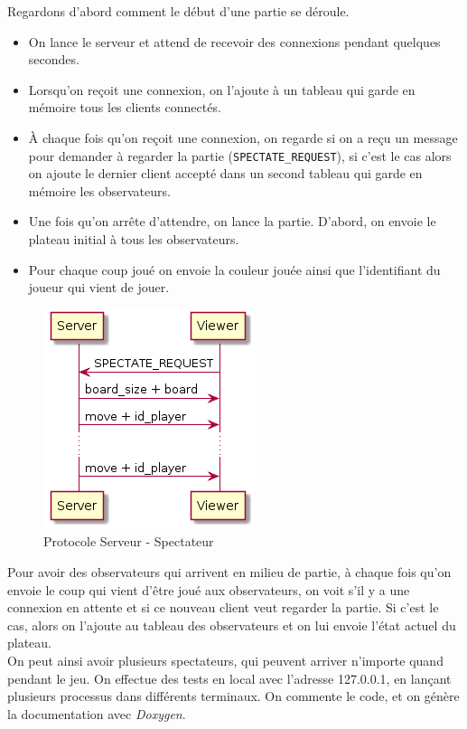 \documentclass[a4paper]{article}
\begin{document}
\noindent Regardons d'abord comment le début d'une partie se déroule.
\begin{itemize}
	\setlength\itemsep{0.5em}
	\item On lance le serveur et attend de recevoir des connexions pendant 
	quelques secondes.
	\item Lorsqu'on reçoit une connexion, on l'ajoute à un tableau qui garde en 
	mémoire tous les clients connectés.
	\item À chaque fois qu'on reçoit une connexion, on regarde si on a reçu un 
	message pour demander à regarder la partie (\texttt{SPECTATE\_REQUEST}), si c'est le cas alors on ajoute 
	le dernier client accepté dans un second tableau qui garde en mémoire les 
	observateurs.
	\item Une fois qu'on arrête d'attendre, on lance la partie. D'abord, on 
	envoie le plateau initial à tous les observateurs.
	\item Pour chaque coup joué on envoie la couleur jouée ainsi que  
	l'identifiant du joueur qui vient de jouer. \\
\end{itemize}

%
\begin{figure}[H]
	\centering
	\includegraphics[scale=0.6]{viewer.png}
	\caption{Protocole Serveur - Spectateur}
\end{figure}
%

\noindent Pour avoir des observateurs qui arrivent en milieu de partie, à chaque fois
qu'on envoie le coup qui vient d'être joué aux observateurs, on voit s'il y a
une connexion en attente et si ce nouveau client veut regarder la partie. Si c'est le cas, alors 
on l'ajoute au tableau des observateurs et on lui envoie l'état actuel du
plateau. \\

On peut ainsi avoir plusieurs spectateurs, qui peuvent arriver n'importe quand pendant le jeu. On effectue des tests en local avec l'adresse 127.0.0.1, en lançant plusieurs processus dans différents terminaux. On commente le code, et on génère la documentation avec \emph{Doxygen}.
\end{document}
